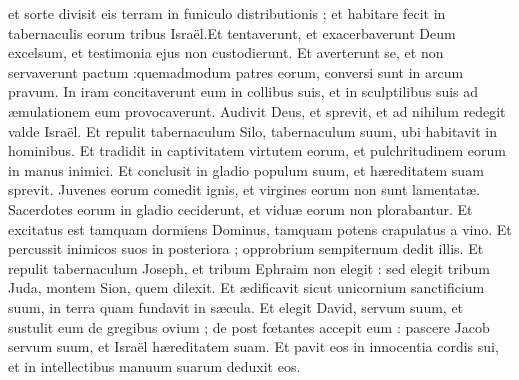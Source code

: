 {et sorte divisit eis terram in funiculo distributionis ;  \EVERSE
\VERSE et habitare fecit in tabernaculis eorum tribus Israël.\VERSE Et tentaverunt,  et exacerbaverunt Deum excelsum, et testimonia ejus non custodierunt. \EVERSE
\VERSE Et averterunt se,  et non servaverunt pactum :quemadmodum patres eorum,  conversi sunt in arcum pravum. \EVERSE
\VERSE In iram concitaverunt eum in collibus suis, et in sculptilibus suis ad æmulationem eum provocaverunt. \EVERSE
\VERSE Audivit Deus,  et sprevit, et ad nihilum redegit valde Israël. \EVERSE
\VERSE Et repulit tabernaculum Silo, tabernaculum suum,  ubi habitavit in hominibus. \EVERSE
\VERSE Et tradidit in captivitatem virtutem eorum, et pulchritudinem eorum in manus inimici. \EVERSE
\VERSE Et conclusit in gladio populum suum, et hæreditatem suam sprevit. \EVERSE
\VERSE Juvenes eorum comedit ignis, et virgines eorum non sunt lamentatæ. \EVERSE
\VERSE Sacerdotes eorum in gladio ceciderunt, et viduæ eorum non plorabantur. \EVERSE
\VERSE Et excitatus est tamquam dormiens Dominus, tamquam potens crapulatus a vino. \EVERSE
\VERSE Et percussit inimicos suos in posteriora ; opprobrium sempiternum dedit illis. \EVERSE
\VERSE Et repulit tabernaculum Joseph, et tribum Ephraim non elegit : \EVERSE
\VERSE sed elegit tribum Juda, montem Sion,  quem dilexit. \EVERSE
\VERSE Et ædificavit sicut unicornium sanctificium suum, in terra quam fundavit in sæcula. \EVERSE
\VERSE Et elegit David,  servum suum, et sustulit eum de gregibus ovium ; 
de post fœtantes accepit eum : \EVERSE
\VERSE pascere Jacob servum suum, et Israël hæreditatem suam. \EVERSE
\VERSE Et pavit eos in innocentia cordis sui, et in intellectibus manuum suarum deduxit eos.

}
